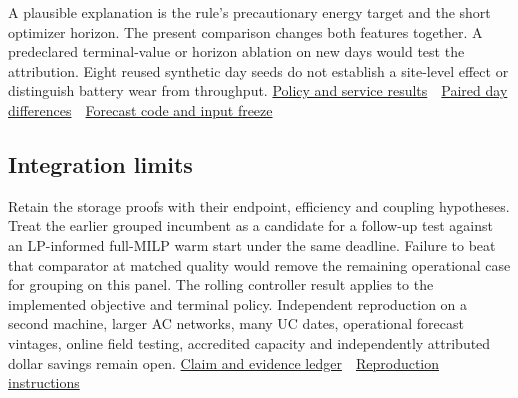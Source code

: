 \documentclass[11pt,letterpaper]{article}
\begin{document}
A plausible explanation is the rule's precautionary energy target and the short optimizer horizon. The present comparison changes both features together. A predeclared terminal-value or horizon ablation on new days would test the attribution. Eight reused synthetic day seeds do not establish a site-level effect or distinguish battery wear from throughput. \href{https://github.com/nousentllc/VP-VNP-Review/blob/energy-explorations/energy/W03/results/E/comparison.csv}{Policy and service results} \,\textperiodcentered\, \href{https://github.com/nousentllc/VP-VNP-Review/blob/energy-explorations/energy/W03/results/E/paired.json}{Paired day differences} \,\textperiodcentered\, \href{https://github.com/nousentllc/VP-VNP-Review/commit/30eb36e66821653e963ec106c5d6a00235ce584c}{Forecast code and input freeze}\par
\subsection*{Integration limits}
Retain the storage proofs with their endpoint, efficiency and coupling hypotheses. Treat the earlier grouped incumbent as a candidate for a follow-up test against an LP-informed full-MILP warm start under the same deadline. Failure to beat that comparator at matched quality would remove the remaining operational case for grouping on this panel. The rolling controller result applies to the implemented objective and terminal policy. Independent reproduction on a second machine, larger AC networks, many UC dates, operational forecast vintages, online field testing, accredited capacity and independently attributed dollar savings remain open. \href{https://github.com/nousentllc/VP-VNP-Review/blob/energy-explorations/energy/W03/claims.csv}{Claim and evidence ledger} \,\textperiodcentered\, \href{https://github.com/nousentllc/VP-VNP-Review/blob/energy-explorations/energy/W03/README.md}{Reproduction instructions}\par
\end{document}
